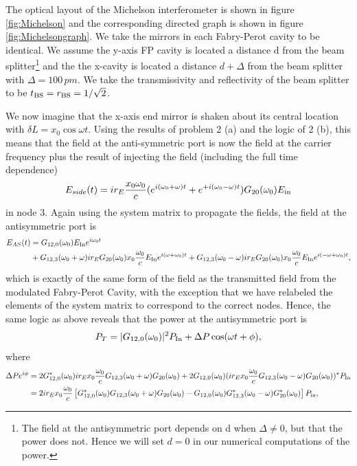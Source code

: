 \documentclass[11pt]{article}
\begin{document}
\begin{enumerate}
\begin{itemize}
The optical layout of the Michelson interferometer is shown in figure \ref{fig:Michelson} and the corresponding directed graph is shown in figure \ref{fig:Michelsongraph}. We take the mirrors in each Fabry-Perot cavity to be identical. We assume the y-axis FP cavity is located a distance d from the beam splitter\footnote{The field at the antisymmetric port depends on d when $\Delta \neq 0$, but that the power does not. Hence we will set $d=0$ in our numerical computations of the power.} and the the x-cavity is located a distance $d+\Delta$ from the beam splitter with $\Delta =100\,pm$. We take the transmissivity and reflectivity of the beam splitter to be $t_{\rm BS}=r_{\rm BS}=1/\sqrt{2}$.


We now imagine that the x-axis end mirror is shaken about its central location with $\delta L= x_0\cos\omega t$. Using the results of problem 2 (a) and the logic of 2 (b), this means that the field at the anti-symmetric port is now the field at the carrier frequency plus the result of injecting the field (including the full time dependence)
\begin{align}
E_{side}(t)=ir_E\frac{x_0\omega_0}{c}(e^{i(\omega_0 +\omega)t}+e^{+i(\omega_0-\omega )t})G_{20}(\omega_0)E_{\rm in}
\end{align}
in node 3. Again using the system matrix to propagate the fields, the field at the antisymmetric port is
\begin{align}
E_{AS}(t)&=G_{12,0}(\omega_0)E_{\rm In}e^{i\omega_0 t} \nonumber \\
&+G_{12,3}(\omega_0+\omega)ir_EG_{20}(\omega_0)x_0\frac{\omega_0}{c}E_{\rm In}e^{i(\omega+\omega_0)t}
+G_{12,3}(\omega_0-\omega)ir_EG_{20}(\omega_0)x_0\frac{\omega_0}{c}E_{\rm In}e^{i(-\omega+\omega_0)t}, \label{eq:EASmod}
\end{align}
which is exactly of the same form of the field as the transmitted field from the modulated Fabry-Perot Cavity, with the exception that we have relabeled the elements of the system matrix to correspond to the correct nodes. Hence, the same logic as above reveals that the power at the antisymmetric port is
\begin{align}
P_T=|G_{12,0}(\omega_0)|^2P_{\rm In}+\Delta P\cos(\omega t+\phi),
\end{align}
where 
\begin{align}
\Delta P e^{i\phi}&=2G^*_{12,0}(\omega_0)ir_Ex_0\frac{\omega_0}{c}G_{12,3}(\omega_0+\omega)G_{20}(\omega_0)+2G_{12,0}(\omega_0)(ir_Ex_0\frac{\omega_0}{c}G_{12,3}(\omega_0-\omega)G_{20}(\omega_0))^*P_{\rm In} \nonumber \\
&=2ir_Ex_0\frac{\omega_0}{c}\left[G^*_{12,0}(\omega_0)G_{12,3}(\omega_0+\omega)G_{20}(\omega_0)-G_{12,0}(\omega_0)G^*_{12,3}(\omega_0-\omega)G^*_{20}(\omega_0)\right]P_{\rm in},
\end{align}



\end{itemize}
\end{enumerate}
\end{document}
